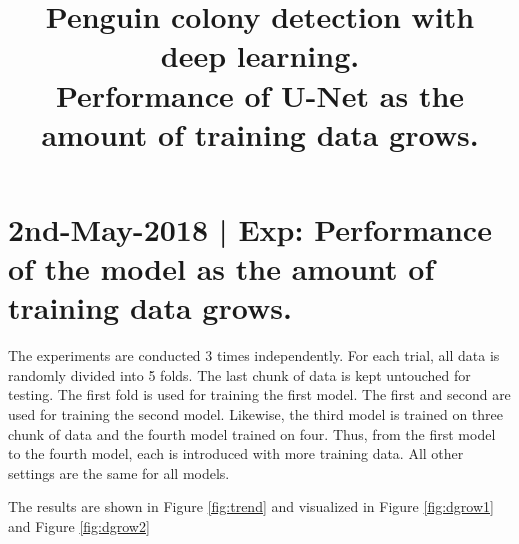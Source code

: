 \documentclass[runningheads]{llncs}
\begin{document}
\pagestyle{headings}
\mainmatter

\title{Penguin colony detection with deep learning.\\
\large Performance of U-Net as the amount of training data grows.
} %


\maketitle

\section{2nd-May-2018 | Exp: Performance of the model as the amount of training data grows.}

The experiments are conducted 3 times independently. For each trial, all data is randomly divided into 5 folds. The last chunk of data is kept untouched for testing. The first fold is used for training the first model. The first and second are used for training the second model. Likewise, the third model is trained on three chunk of data and the fourth model trained on four. Thus, from the first model to the fourth model, each is introduced with more training data. All other settings are the same for all models.

The results are shown in Figure \ref{fig:trend} and visualized in Figure \ref{fig:dgrow1} and Figure \ref{fig:dgrow2}  
\end{document}
